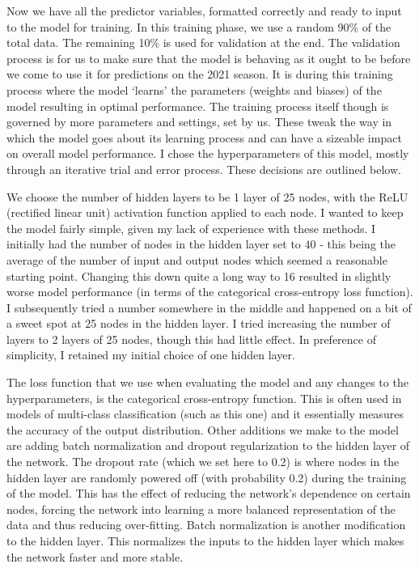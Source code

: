 Now we have all the predictor variables, formatted correctly and ready to input to the model for training. In this training phase, we use a random 90\% of the total data. The remaining 10\% is used for validation at the end. The validation process is for us to make sure that the model is behaving as it ought to be before we come to use it for predictions on the 2021 season. It is during this training process where the model `learns' the parameters (weights and biases) of the model resulting in optimal performance. The training process itself though is governed by more parameters and settings, set by us. These tweak the way in which the model goes about its learning process and can have a sizeable impact on overall model performance. I chose the hyperparameters of this model, mostly through an iterative trial and error process. These decisions are outlined below.

We choose the number of hidden layers to be 1 layer of 25 nodes, with the ReLU (rectified linear unit) activation function applied to each node. I wanted to keep the model fairly simple, given my lack of experience with these methods. I initially had the number of nodes in the hidden layer set to 40 - this being the average of the number of input and output nodes which seemed a reasonable starting point. Changing this down quite a long way to 16 resulted in slightly worse model performance (in terms of the categorical cross-entropy loss function). I subsequently tried a number somewhere in the middle and happened on a bit of a sweet spot at 25 nodes in the hidden layer. I tried increasing the number of layers to 2 layers of 25 nodes, though this had little effect. In preference of simplicity, I retained my initial choice of one hidden layer.

The loss function that we use when evaluating the model and any changes to the hyperparameters, is the categorical cross-entropy function. This is often used in models of multi-class classification (such as this one) and it essentially measures the accuracy of the output distribution. \cite{noauthor_categorical_nodate} Other additions we make to the model are adding batch normalization and dropout regularization to the hidden layer of the network. The dropout rate (which we set here to 0.2) is where nodes in the hidden layer are randomly powered off (with probability 0.2) during the training of the model. This has the effect of reducing the network's dependence on certain nodes, forcing the network into learning a more balanced representation of the data and thus reducing over-fitting. \cite{ghatak_deep_2019} Batch normalization is another modification to the hidden layer. This normalizes the inputs to the hidden layer which makes the network faster and more stable. \cite{ioffe_batch_2015}

